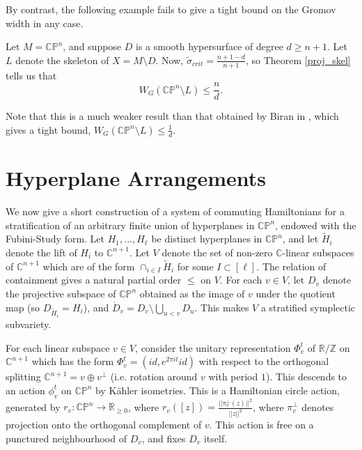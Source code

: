 \documentclass{article}
\numberwithin{equation}{section}
\numberwithin{figure}{section}
\begin{document}
By contrast, the following example fails to give a tight bound on the Gromov width in any case.
\begin{cor}
Let  $M=\mathbb{CP}^n$, and suppose $D$ is a smooth hypersurface of degree $d\geq n+1$. Let $L$ denote the skeleton of $X=M\setminus D$. Now, $\tilde{\sigma}_{crit}=\frac{n+1-d}{n+1}$, so Theorem \ref{proj_skel} tells us that 
\begin{equation}
W_G(\mathbb{CP}^n\setminus L)\leq \frac{n}{d}.
\end{equation}
\end{cor}
Note that this is a much weaker result than that obtained by Biran in \cite{Biran}, which gives a tight bound, $W_G(\mathbb{CP}^n\setminus L)\leq \frac{1}{d}$.

\section{Hyperplane Arrangements}
\label{hyperplane_arr_construction}
We now give a short construction of a system of commuting Hamiltonians for a stratification of an arbitrary finite union of hyperplanes in $\mathbb{CP}^n$, endowed with the Fubini-Study form. Let $H_1,...,H_\ell$ be distinct hyperplanes in $\mathbb{CP}^{n}$, and let $\tilde{H}_i$ denote the lift of $H_i$ to $\mathbb{C}^{n+1}$. Let $V$ denote the set of non-zero $\mathbb{C}$-linear subspaces of $\mathbb{C}^{n+1}$ which are of the form $\cap_{i\in I}\tilde{H}_i$ for some $I\subset [\ell]$. The relation of containment gives a natural partial order $\leq$ on $V$. For each $v\in V$, let $D_v$ denote the projective subspace of $\mathbb{CP}^n$ obtained as the image of $v$ under the quotient map (so $D_{\tilde{H}_i}=H_i$), and $\mathring{D}_v=D_v\setminus \bigcup_{u<v}D_u$. This makes $V$ a stratified symplectic subvariety.

For each linear subspace $v\in V$, consider the unitary representation $\Phi_v^t$ of $\mathbb{R}/\mathbb{Z}$ on $\mathbb{C}^{n+1}$ which has the form $\Phi^t_v=(id,e^{2\pi it}id)$ with respect to the orthogonal splitting $\mathbb{C}^{n+1}=v\oplus v^\perp$ (i.e. rotation around $v$ with period $1$). This descends to an action $\phi_v^t$ on $\mathbb{CP}^n$ by K\"ahler isometries. This is a Hamiltonian circle action, generated by $r_v:\mathbb{CP}^n\rightarrow \mathbb{R}_{\geq 0}$, where $r_v([z])=\frac{||\pi_v^\perp(z)||^2}{||z||^2}$, where $\pi_v^\perp$ denotes projection onto the orthogonal complement of $v$. This action is free on a punctured neighbourhood of $D_v$, and fixes $D_v$ itself.
\end{document}
